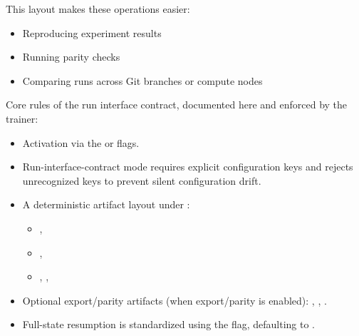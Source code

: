 This layout makes these operations easier:
\begin{itemize}
  \item Reproducing experiment results
  \item Running parity checks
  \item Comparing runs across Git branches or compute nodes
\end{itemize}

Core rules of the run interface contract, documented here and enforced by the trainer:
\begin{itemize}
  \item Activation via the  or  flags.
  \item Run-interface-contract mode requires explicit configuration keys and rejects unrecognized keys to prevent silent configuration drift.
  \item A deterministic artifact layout under :
    \begin{itemize}
      \item {}, 
      \item {}, 
      \item {}, , 
    \end{itemize}
  \item Optional export/parity artifacts (when export/parity is enabled):
    , , .
  \item Full-state resumption is standardized using the  flag, defaulting to .
\end{itemize}

